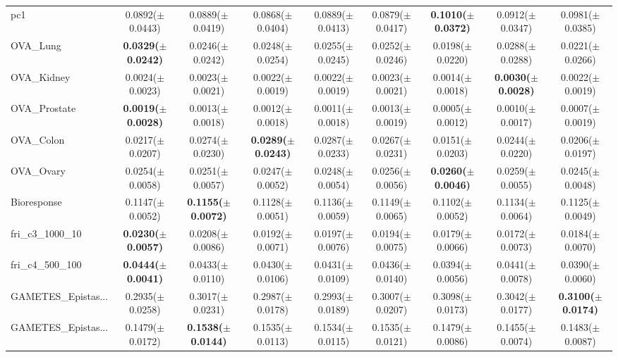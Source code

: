 \begin{longtable}{lcccccccc}
pc1 & 0.0892($\pm$0.0443) & 0.0889($\pm$0.0419) & 0.0868($\pm$0.0404) & 0.0889($\pm$0.0413) & 0.0879($\pm$0.0417) & \textbf{0.1010($\pm$0.0372)} & 0.0912($\pm$0.0347) & 0.0981($\pm$0.0385) \\
OVA\_Lung & \textbf{0.0329($\pm$0.0242)} & 0.0246($\pm$0.0242) & 0.0248($\pm$0.0254) & 0.0255($\pm$0.0245) & 0.0252($\pm$0.0246) & 0.0198($\pm$0.0220) & 0.0288($\pm$0.0288) & 0.0221($\pm$0.0266) \\
OVA\_Kidney & 0.0024($\pm$0.0023) & 0.0023($\pm$0.0021) & 0.0022($\pm$0.0019) & 0.0022($\pm$0.0019) & 0.0023($\pm$0.0021) & 0.0014($\pm$0.0018) & \textbf{0.0030($\pm$0.0028)} & 0.0022($\pm$0.0019) \\
OVA\_Prostate & \textbf{0.0019($\pm$0.0028)} & 0.0013($\pm$0.0018) & 0.0012($\pm$0.0018) & 0.0011($\pm$0.0018) & 0.0013($\pm$0.0019) & 0.0005($\pm$0.0012) & 0.0010($\pm$0.0017) & 0.0007($\pm$0.0019) \\
OVA\_Colon & 0.0217($\pm$0.0207) & 0.0274($\pm$0.0230) & \textbf{0.0289($\pm$0.0243)} & 0.0287($\pm$0.0233) & 0.0267($\pm$0.0231) & 0.0151($\pm$0.0203) & 0.0244($\pm$0.0220) & 0.0206($\pm$0.0197) \\
OVA\_Ovary & 0.0254($\pm$0.0058) & 0.0251($\pm$0.0057) & 0.0247($\pm$0.0052) & 0.0248($\pm$0.0054) & 0.0256($\pm$0.0056) & \textbf{0.0260($\pm$0.0046)} & 0.0259($\pm$0.0055) & 0.0245($\pm$0.0048) \\
Bioresponse & 0.1147($\pm$0.0052) & \textbf{0.1155($\pm$0.0072)} & 0.1128($\pm$0.0051) & 0.1136($\pm$0.0059) & 0.1149($\pm$0.0065) & 0.1102($\pm$0.0052) & 0.1134($\pm$0.0064) & 0.1125($\pm$0.0049) \\
fri\_c3\_1000\_10 & \textbf{0.0230($\pm$0.0057)} & 0.0208($\pm$0.0086) & 0.0192($\pm$0.0071) & 0.0197($\pm$0.0076) & 0.0194($\pm$0.0075) & 0.0179($\pm$0.0066) & 0.0172($\pm$0.0073) & 0.0184($\pm$0.0070) \\
fri\_c4\_500\_100 & \textbf{0.0444($\pm$0.0041)} & 0.0433($\pm$0.0110) & 0.0430($\pm$0.0106) & 0.0431($\pm$0.0109) & 0.0436($\pm$0.0140) & 0.0394($\pm$0.0056) & 0.0441($\pm$0.0078) & 0.0390($\pm$0.0060) \\
GAMETES\_Epistas... & 0.2935($\pm$0.0258) & 0.3017($\pm$0.0231) & 0.2987($\pm$0.0178) & 0.2993($\pm$0.0189) & 0.3007($\pm$0.0207) & 0.3098($\pm$0.0173) & 0.3042($\pm$0.0177) & \textbf{0.3100($\pm$0.0174)} \\
GAMETES\_Epistas... & 0.1479($\pm$0.0172) & \textbf{0.1538($\pm$0.0144)} & 0.1535($\pm$0.0113) & 0.1534($\pm$0.0115) & 0.1535($\pm$0.0121) & 0.1479($\pm$0.0086) & 0.1455($\pm$0.0074) & 0.1483($\pm$0.0087) \\

\end{longtable}
